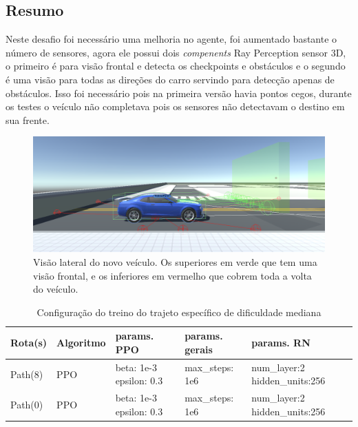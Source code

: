 \subsection*{Resumo}
Neste desafio foi necessário uma melhoria no agente, foi aumentado bastante o número de sensores, agora ele possui dois \textit{compenents} Ray Perception sensor 3D, o primeiro é para visão frontal e detecta os checkpoints e obstáculos e o segundo é uma visão para todas as direções do carro servindo para detecção apenas de obstáculos. Isso foi necessário pois na primeira versão havia pontos cegos, durante os testes o veículo não completava pois os sensores não detectavam o destino em sua frente.

\begin{figure}[h]
    \centering
    \includegraphics[scale=0.35]{figs/treinos/desafio-mediano/novo-modelo-agente.png}
     \caption{Visão lateral do novo veículo. Os superiores em verde que tem uma visão frontal, e os inferiores em vermelho que cobrem toda a volta do veículo.}
     \label{fig:desafio-2-novo-agente}
\end{figure}



\begin{table}[htpb]
    \centering
    \caption{Configuração do treino do trajeto específico de dificuldade mediana}
    \begin{tabular}{|l|p{2cm}|p{3cm}|p{3cm}|p{3.5cm}|}
         \hline
         \small{Rota(s)} & \small{Algoritmo} &          \small{params. PPO}         & \small{params. gerais} &          \small{params. RN}              \\ \hline
            Path(8)      &      PPO          &     beta: 1e-3 \newline epsilon: 0.3 &    max\_steps: 1e6  &    num\_layer:2 \newline hidden\_units:256  \\ \hline
            Path(0)      &      PPO          &     beta: 1e-3 \newline epsilon: 0.3 &    max\_steps: 1e6  &    num\_layer:2 \newline hidden\_units:256  \\ \hline
    \end{tabular}
 \end{table}

